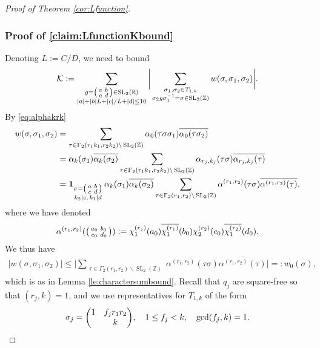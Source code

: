 \documentclass[12pt]{amsart}
\theoremstyle{definition}
\theoremstyle{remark}
\numberwithin{equation}{section}
\newcommand{\R}{{\mathbb R}}
\newcommand{\Z}{{\mathbb Z}}
\newcommand{\1}{{\mathbf 1}}
\newcommand{\SL}{\operatorname{SL}_2}
\begin{document}
\begin{proof}[Proof of Theorem \ref{cor:Lfunction}]
\subsubsection{Proof of \eqref{claim:LfunctionKbound}}
Denoting $L:=C/D$, we need to bound
\begin{align*}
\mathcal{K} := \sum_{\substack{g = \smqty(a &b \\ c &d ) \in  \SL(\R) \\ |a| + |b|L + |c|/L + |d| \leq 10 }} \bigg| \sum_{\substack{\sigma_1,\sigma_2 \in T_{1,k} \\ \sigma_2 g \sigma_1^{-1} =\sigma \in \SL(\Z) }} w(\sigma,\sigma_1,\sigma_2)\bigg|.
\end{align*}
By \eqref{eq:alphakrk}
\begin{align*}  w(\sigma,\sigma_1,\sigma_2)&=\sum_{\substack{\tau\in \Gamma_2(r_1k_1,r_2k_2) \backslash \SL(\Z)}  } \alpha_0(\tau \sigma \sigma_1)\overline{\alpha_0(\tau \sigma_2)} \\
&= \alpha_k(\sigma_1) \overline{\alpha_k(\sigma_2)} \sum_{\substack{\tau\in \Gamma_2(r_1k_1,r_2k_2) \backslash \SL(\Z)}  } \alpha_{r_j,k_j}(\tau \sigma)\overline{\alpha_{r_j,k_j}(\tau)}   \\
& = \mathbf{1}_{\substack{\sigma = \smqty(a & b \\ c & d) \\ k_2 | c ,\, k_1 | d } }  \,\alpha_k(\sigma_1) \overline{\alpha_k(\sigma_2)} \sum_{\substack{\tau\in \Gamma_2(r_1,r_2) \backslash \SL(\Z)}  }  \alpha^{(r_1,r_2)}(\tau \sigma)\overline{\alpha^{(r_1,r_2)}(\tau)},
\end{align*}
where we have denoted
\begin{align*}
  \alpha^{(r_1,r_2)}(\smqty(a_0 & b_0 \\ c_0 & d_0)) :=  \chi_{1}^{(r_j)}( a_0) \overline{\chi_{1}^{(r_1)}}(b_0) \chi_{2}^{(r_2)}( c_0) \overline{\chi_{1}^{(r_2)}}(d_0).
\end{align*}
We thus have 
\begin{align*}
|w(\sigma,\sigma_1,\sigma_2)| \leq \bigg|\sum_{\substack{\tau\in  \Gamma_2(r_1,r_2) \backslash \SL(\Z)}  } \alpha^{(r_1,r_2)}(\tau \sigma) \overline{\alpha^{(r_1,r_2)}(\tau) } \bigg| =: w_0(\sigma), 
\end{align*}
which is as in Lemma \ref{le:charactersumbound}. Recall that $q_j$ are square-free so that $(r_j,k)=1$, and we use representatives for $T_{1,k}$ of the form
\begin{align*}
    \sigma_j = \mqty(1 & f_j r_1 r_2 \\ & k), \quad 1 \leq f_j < k, \quad \gcd(f_j,k)=1.

\end{align*}
\end{proof}
\end{document}
